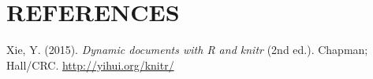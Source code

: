 \documentclass{source/tex/templates/maththesis}
\newlength{\cslhangindent}
\newenvironment{CSLReferences}[2] %
 {%
  \setlength{\parindent}{0pt}
  \ifodd #1
  \let\oldpar\par
  \def\par{\hangindent=\cslhangindent\oldpar}
  \fi
  \setlength{\parskip}{1mm}
  \setlength{\baselineskip}{6mm}
 }%
 {}
\begin{document}
\hypertarget{references}{%
\chapter*{REFERENCES}\label{references}}

\hypertarget{refs}{}
\begin{CSLReferences}{1}{0}
\leavevmode{}%
Xie, Y. (2015). \emph{Dynamic documents with {R} and knitr} (2nd ed.). Chapman; Hall/CRC. \url{http://yihui.org/knitr/}

\end{CSLReferences}

\end{document}
